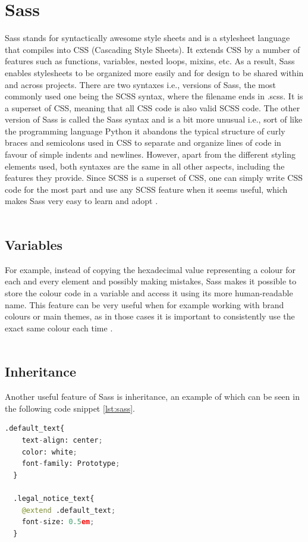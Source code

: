 \section{Sass}
Sass stands for syntactically awesome style sheets and is a stylesheet language that compiles into CSS (Cascading Style Sheets). It extends CSS by a number
of features such as functions, variables, nested loops, mixins, etc. As a result, Sass enables stylesheets to be organized more easily and for design
to be shared within and across projects. There are two syntaxes i.e., versions of Sass, the most commonly used one being the SCSS syntax, where the
filename ends in .scss. It is a superset of CSS, meaning that all CSS code is also valid SCSS code. The other version of Sass is called the Sass syntax
and is a bit more unusual i.e., sort of like the programming language Python it abandons the typical structure of curly braces and semicolons used in CSS
to separate and organize lines of code in favour of simple indents and newlines. However, apart from the different styling elements used, both syntaxes
are the same in all other aspects, including the features they provide. Since SCSS is a superset of CSS, one can simply write CSS code for the most part
and use any SCSS feature when it seems useful, which makes Sass very easy to learn and adopt \cite{SassFeatures}.
\\
\\
\subsection{Variables}
For example, instead of copying the hexadecimal value representing a colour for each and every element and possibly making mistakes, Sass makes it possible
to store the colour code in a variable and access it using its more human-readable name. This feature can be very useful when for example working with brand
colours or main themes, as in those cases it is important to consistently use the exact same colour each time \cite{SassFeatures}.
\\
\\
\subsection{Inheritance}
Another useful feature of Sass is inheritance, an example of which can be seen in the following code snippet \ref{lst:sass}.

\begin{lstlisting}[language=Python,caption=Textstyling in Sass,label=lst:sass]
  .default_text{
    text-align: center;
    color: white;
    font-family: Prototype;
  }

  .legal_notice_text{
    @extend .default_text;
    font-size: 0.5em;
  }
\end{lstlisting}

